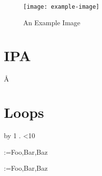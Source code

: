 \documentclass{article}
\begin{document}
\begin{figure}[htbp]
\centering
 \texttt{[image: example-image]}
 \caption{An Example Image}
 \label{fig:sample}
\end{figure}

\section{IPA}\label{sec:ipa}
 \AA {}
\textschwa

\section{Loops}

\newcount\myctr
\loop
 \advance\myctr by 1\relax
 \the\myctr.
\ifnum\myctr<10
\repeat

\makeatletter
\@for\tmp:=Foo,Bar,Baz

\def\tmplist{Foo,Bar,Baz}
\@for\tmp:=\tmplist{}
\makeatother



\end{document}
